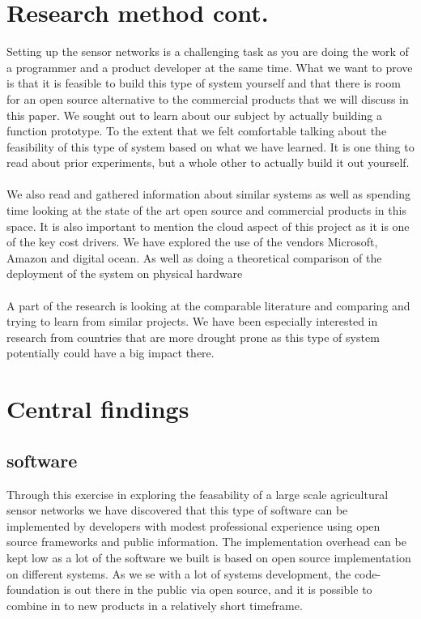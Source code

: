 \documentclass[]{uiophd}
\begin{document}
\section{Research method cont.}
Setting up the sensor networks is a challenging task as you are doing the work of a programmer and a product developer at the same time. What we want to prove is that it is feasible to build this type of system yourself and that there is room for an open source alternative to the commercial products that we will discuss in this paper. We sought out to learn about our subject by actually building a function prototype. To the extent that we felt comfortable talking about the feasibility of this type of system based on what we have learned. It is one thing to read about prior experiments, but a whole other to actually build it out yourself.
\\\\
We also read and gathered information about similar systems as well as spending time looking at the state of the art open source and commercial products in this space. It is also important to mention the cloud aspect of this project as it is one of the key cost drivers. We have explored the use of the vendors Microsoft, Amazon and digital ocean. As well as doing a theoretical comparison of the deployment of the system on physical hardware
\\\\
A part of the research is looking at the comparable literature and comparing and trying to learn from similar projects. We have been especially interested in research from countries that are more drought prone as this type of system potentially could have a big impact there.

\section{Central findings}
\subsection{software}
Through this exercise in exploring the feasability of a large scale agricultural sensor networks we have discovered that this type of software can be implemented by developers with modest professional experience using open source frameworks and public information. The implementation overhead can be kept low as a lot of the software we built is based on open source implementation on different systems. As we se with a lot of systems development, the code-foundation is out there in the public via open source, and it is possible to combine in to new products in a relatively short timeframe.
\end{document}
